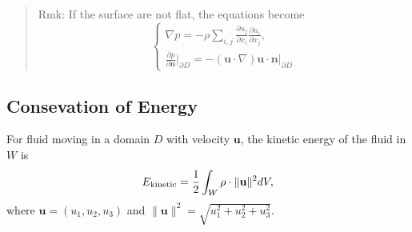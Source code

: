\begin{quote}
	Rmk:
If the surface are not flat, the equations become
\begin{equation}
\begin{cases}
\displaystyle \nabla p
= - \rho \sum_{i,j}\frac{\partial u_j}{\partial x_i}\frac{\partial u_i}{\partial x_j},\\
\displaystyle \frac{\partial p}{\partial \textbf{n}}\Bigg|_{\partial D}
= - \left(\textbf{u}\cdot\nabla\right)\textbf{u}\cdot \textbf{n}\Bigg|_{\partial D}
\end{cases}
\end{equation}

\end{quote}


\subsection{Consevation of Energy} %

For fluid moving in a domain $D$ with velocity $\textbf{u}$, the kinetic energy of the fluid in $W$ is 
\begin{equation}
E_{\rm kinetic} = \frac{1}{2}\int_{W}\rho \cdot \lVert\textbf{u}\rVert^2 dV,
\end{equation}
where $\textbf{u} = (u_1,u_2,u_3)$ and $\lVert\textbf{u}\rVert^2 = \sqrt{u_1^2+u_2^2+u_3^2}$.

